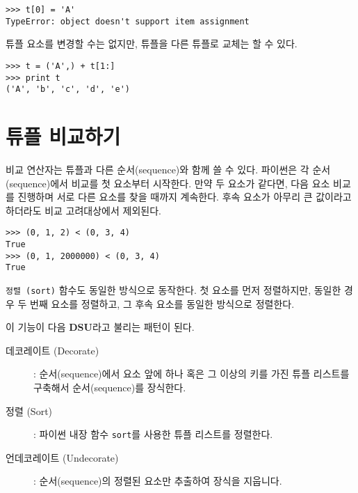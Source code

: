 \beforeverb
\begin{verbatim}
>>> t[0] = 'A'
TypeError: object doesn't support item assignment
\end{verbatim}
\afterverb
%

튜플 요소를 변경할 수는 없지만, 튜플을 다른 튜플로 교체는 할 수 있다.

\beforeverb
\begin{verbatim}
>>> t = ('A',) + t[1:]
>>> print t
('A', 'b', 'c', 'd', 'e')
\end{verbatim}
\afterverb
%

\section{튜플 비교하기}


비교 연산자는 튜플과 다른 순서(sequence)와 함께 쓸 수 있다. 
파이썬은 각 순서(sequence)에서 비교를 첫 요소부터 시작한다.
만약 두 요소가 같다면, 다음 요소 비교를 진행하며 서로 다른 요소를 찾을 때까지 계속한다. 
후속 요소가 아무리 큰 값이라고 하더라도 비교 고려대상에서 제외된다.

\beforeverb
\begin{verbatim}
>>> (0, 1, 2) < (0, 3, 4)
True
>>> (0, 1, 2000000) < (0, 3, 4)
True
\end{verbatim}
\afterverb
%

{\tt 정렬 (sort)} 함수도 동일한 방식으로 동작한다.
첫 요소를 먼저 정렬하지만, 동일한 경우 두 번째 요소를 정렬하고, 그 후속 요소를 동일한 방식으로 정렬한다.

이 기능이 다음 {\bf DSU}라고 불리는 패턴이 된다.

\begin{description}

\item[데코레이트 (Decorate)] : 순서(sequence)에서 요소 앞에 하나 혹은 그 이상의 키를 가진 튜플 리스트를 구축해서 순서(sequence)를 장식한다.

\item[정렬 (Sort)] : 파이썬 내장 함수 {\tt sort}를 사용한 튜플 리스트를 정렬한다.

\item[언데코레이트 (Undecorate)] : 순서(sequence)의 정렬된 요소만 추출하여 장식을 지웁니다.

\end{description}

